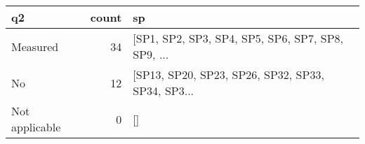 \begin{tabular}{lrl}
\toprule
             q2 &  count &                                                 sp \\
\midrule
       Measured &     34 &  [SP1, SP2, SP3, SP4, SP5, SP6, SP7, SP8, SP9, ... \\
             No &     12 &  [SP13, SP20, SP23, SP26, SP32, SP33, SP34, SP3... \\
 Not applicable &      0 &                                                 [] \\
\bottomrule
\end{tabular}
